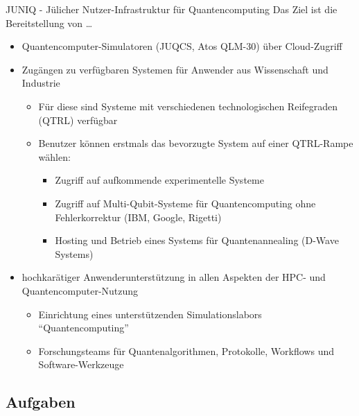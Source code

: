 \begin{jsc}{JUNIQ - Jülicher Nutzer-Infrastruktur für Quantencomputing}
    Das Ziel ist die Bereitstellung von \ldots
    \begin{itemize}[\ldots]
        \item Quantencomputer-Simulatoren (JUQCS, Atos QLM-30) über Cloud-Zugriff
        \item Zugängen zu verfügbaren Systemen für Anwender aus Wissenschaft und Industrie
              \begin{itemize}
                  \item Für diese sind Systeme mit verschiedenen technologischen Reifegraden (QTRL) verfügbar
                  \item Benutzer können erstmals das bevorzugte System auf einer QTRL-Rampe wählen:
                        \begin{itemize}
                            \item Zugriff auf aufkommende experimentelle Systeme
                            \item Zugriff auf Multi-Qubit-Systeme für Quantencomputing ohne Fehlerkorrektur (IBM, Google, Rigetti)
                            \item Hosting und Betrieb eines Systems für Quantenannealing (D-Wave Systems)
                        \end{itemize}
              \end{itemize}
        \item hochkarätiger Anwenderunterstützung in allen Aspekten der HPC- und Quantencomputer-Nutzung
              \begin{itemize}
                  \item Einrichtung eines unterstützenden Simulationslabors \enquote{Quantencomputing}
                  \item Forschungsteams für Quantenalgorithmen, Protokolle, Workflows und Software-Werkzeuge
              \end{itemize}
    \end{itemize}
\end{jsc}

\subsection{Aufgaben}

